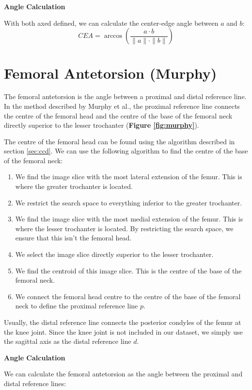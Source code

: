 \documentclass[a4paper,12pt]{article}
\newcommand{\subheading}[1]{\bigskip \large \noindent \textbf{#1}\bigskip \normalsize}
\begin{document}
	\subheading{Angle Calculation}

	\noindent With both axed defined, we can calculate the center-edge angle between $a$ and $b$:
	\[CEA = \arccos\left(\frac{a \cdot b}{\|a\| \cdot \|b\|}\right)\]

	\section{Femoral Antetorsion (Murphy)}
	\label{sec:murphy}
	The femoral antetorsion is the angle between a proximal and distal reference line. In the method described by Murphy et al., the proximal reference line connects the centre of the femoral head and the centre of the base of the femoral neck directly superior to the lesser trochanter (\textbf{Figure \ref{fig:murphy}}).

	The centre of the femoral head can be found using the algorithm described in section \ref{sec:ccd}.
	We can use the following algorithm to find the centre of the base of the femoral neck:

	\begin{enumerate}
		\item We find the image slice with the most lateral extension of the femur.
		This is where the greater trochanter is located.
		\item We restrict the search space to everything inferior to the greater trochanter.
		\item We find the image slice with the most medial extension of the femur.
		This is where the lesser trochanter is located.
		By restricting the search space, we ensure that this isn't the femoral head.
		\item We select the image slice directly superior to the lesser trochanter.
		\item We find the centroid of this image slice.
		This is the centre of the base of the femoral neck.
		\item We connect the femoral head centre to the centre of the base of the femoral neck to define the proximal reference line $p$.
	\end{enumerate}

	\noindent Usually, the distal reference line connects the posterior condyles of the femur at the knee joint.
	Since the knee joint is not included in our dataset, we simply use the sagittal axis as the distal reference line $d$.

	\subheading{Angle Calculation}

	We can calculate the femoral antetorsion as the angle between the proximal and distal reference lines:
\end{document}
